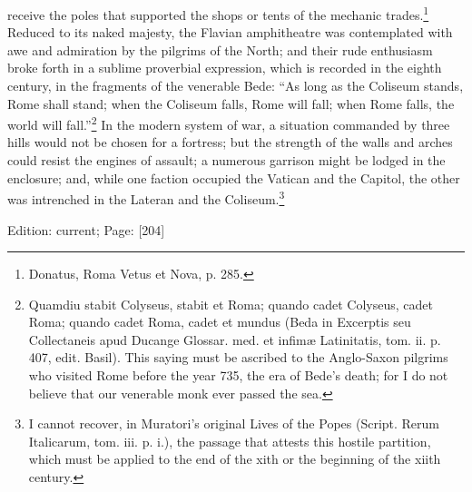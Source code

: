 receive the poles that supported the shops or tents of the mechanic trades.\footnote{Donatus, Roma Vetus et Nova, p. 285.} Reduced to its naked majesty, the Flavian amphitheatre was contemplated with awe and admiration by the pilgrims of the North; and their rude enthusiasm broke forth in a sublime proverbial expression, which is recorded in the eighth century, in the fragments of the venerable Bede: \texthebrew{“}As long as the Coliseum stands, Rome shall stand; when the Coliseum falls, Rome will fall; when Rome falls, the world will fall.\texthebrew{}”\footnote{Quamdiu stabit Colyseus, stabit et Roma; quando cadet Colyseus, cadet Roma; quando cadet Roma, cadet et mundus (Beda in Excerptis seu Collectaneis apud Ducange Glossar. med. et infimæ Latinitatis, tom. ii. p. 407, edit. Basil). This saying must be ascribed to the Anglo-Saxon pilgrims who visited Rome before the year 735, the era of Bede\texthebrew{}’s death; for I do not believe that our venerable monk ever passed the sea.} In the modern system of war, a situation commanded by three hills would not be chosen for a fortress; but the strength of the walls and arches could resist the engines of assault; a numerous garrison might be lodged in the enclosure; and, while one faction occupied the Vatican and the Capitol, the other was intrenched in the Lateran and the Coliseum.\footnote{I cannot recover, in Muratori\texthebrew{}’s original Lives of the Popes (Script. Rerum Italicarum, tom. iii. p. i.), the passage that attests this hostile partition, which must be applied to the end of the xith or the beginning of the xiith century.}

Edition: current; Page: [204]

